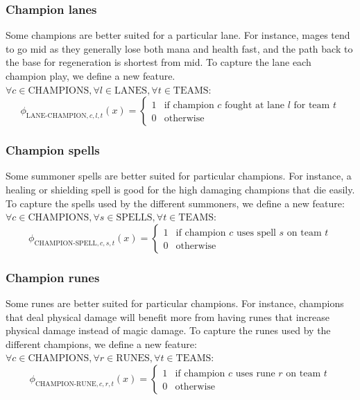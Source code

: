 \subsubsection{Champion lanes}
Some champions are better suited for a particular lane. For instance, mages tend to go mid as they generally lose both mana and health fast, and the path back to the base for regeneration is shortest from mid. To capture the lane each champion play, we define a new feature.
$\forall c \in \text{CHAMPIONS}, \forall l \in \text{LANES}, \forall t \in \text{TEAMS}$:
\begin{equation}\label{eq:championlane}
  \phi_{\text{LANE-CHAMPION},c,l,t}(x) =
\begin{cases}
  1 & \text{if champion } c \text{ fought at lane } l \text{ for team } t\\
  0 & \text{otherwise}
\end{cases}
\end{equation}

\subsubsection{Champion spells}
Some summoner spells are better suited for particular champions. For instance, a healing or shielding spell is good for the high damaging champions that die easily.
To capture the spells used by the different summoners, we define a new feature:
$\forall c \in \text{CHAMPIONS}, \forall s \in \text{SPELLS}, \forall t \in \text{TEAMS}$:
\begin{equation}\label{eq:championspell}
  \phi_{\text{CHAMPION-SPELL},c,s,t}(x) =
\begin{cases} 
  1 & \text{if champion } c \text{ uses spell } s \text{ on team } t\\
  0 & \text{otherwise} 
\end{cases}
\end{equation}

\subsubsection{Champion runes}
Some runes are better suited for particular champions. For instance, champions that deal physical damage will benefit more from having runes that increase physical damage instead of magic damage. To capture the runes used by the different champions, we define a new feature:
$\forall c \in \text{CHAMPIONS}, \forall r \in \text{RUNES}, \forall t \in \text{TEAMS}$:
\begin{equation}\label{eq:championrunes}
  \phi_{\text{CHAMPION-RUNE},c,r,t}(x) =
\begin{cases} 
  1 & \text{if champion } c \text{ uses rune } r \text{ on team } t\\
  0 & \text{otherwise} 
\end{cases}
\end{equation}


